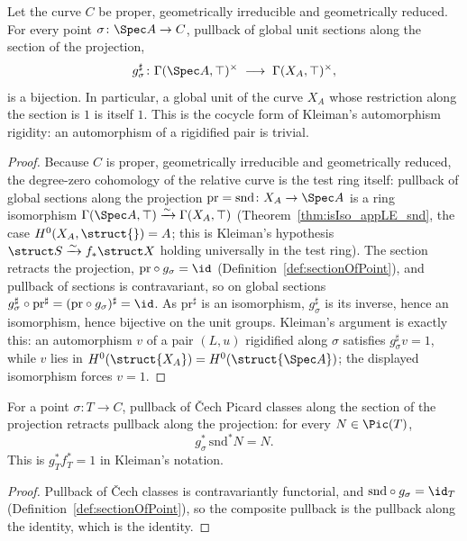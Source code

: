 \begin{theorem}
  \label{thm:unitsAppTop_sectionOfPoint_bijective}
  \leanok
  Let the curve \(C\) be proper, geometrically irreducible and geometrically reduced. For every
  point \(\sigma \colon \Spec A \to C\), pullback of global unit sections along the section of the
  projection,
  \[
    g_\sigma^{\sharp} \colon \Gamma(\Spec A, \top)^{\times}
      \;\longrightarrow\; \Gamma(X_A, \top)^{\times},
  \]
  is a bijection. In particular, a global unit of the curve \(X_A\) whose restriction along the
  section is \(1\) is itself \(1\). This is the cocycle form of Kleiman's automorphism rigidity: an
  automorphism of a rigidified pair is trivial.
\end{theorem}
\begin{proof}
  \leanok
  Because \(C\) is proper, geometrically irreducible and geometrically reduced, the degree-zero
  cohomology of the relative curve is the test ring itself: pullback of global sections along the
  projection \(\mathrm{pr} = \mathrm{snd} \colon X_A \to \Spec A\) is a ring isomorphism
  \(\Gamma(\Spec A, \top) \xrightarrow{\sim} \Gamma(X_A, \top)\)
  (Theorem~\ref{thm:isIso_appLE_snd}, the case \(H^0(X_A, \struct{}) = A\); this is Kleiman's
  hypothesis \(\struct S \xrightarrow{\sim} f_{*}\struct X\) holding universally in the test ring).
  The section retracts the projection, \(\mathrm{pr} \circ g_\sigma = \id\)
  (Definition~\ref{def:sectionOfPoint}), and pullback of sections is contravariant, so on global
  sections \(g_\sigma^{\sharp} \circ \mathrm{pr}^{\sharp} = (\mathrm{pr} \circ g_\sigma)^{\sharp} =
  \id\). As \(\mathrm{pr}^{\sharp}\) is an isomorphism, \(g_\sigma^{\sharp}\) is its inverse, hence
  an isomorphism, hence bijective on the unit groups. Kleiman's argument is exactly this: an
  automorphism \(v\) of a pair \((L, u)\) rigidified along \(\sigma\) satisfies
  \(g_\sigma^{\sharp} v = 1\), while \(v\) lies in \(H^0(\struct{X_A}) = H^0(\struct{\Spec A})\); the
  displayed isomorphism forces \(v = 1\).
\end{proof}

\begin{lemma}
  \label{lem:cechPicMap_sectionOfPoint_snd}
  \leanok
  For a point \(\sigma \colon T \to C\), pullback of \v Cech Picard classes along the section
  of the projection retracts pullback along the projection: for every \(N \in \Pic(T)\),
  \[
    g_\sigma^{*}\,\mathrm{snd}^{*} N = N .
  \]
  This is \(g_T^{*} f_T^{*} = 1\) in Kleiman's notation.
\end{lemma}
\begin{proof}
  \leanok
  Pullback of \v Cech classes is contravariantly functorial, and \(\mathrm{snd} \circ
  g_\sigma = \id_T\) (Definition~\ref{def:sectionOfPoint}), so the composite pullback is the
  pullback along the identity, which is the identity.
\end{proof}

